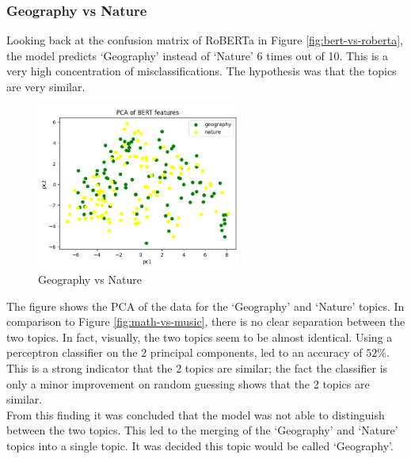 \subsubsection{Geography vs Nature}
Looking back at the confusion matrix of RoBERTa in Figure \ref{fig:bert-vs-roberta}, the model predicts `Geography' instead of
`Nature' 6 times out of 10. This is a very high concentration of misclassifications. The hypothesis was that the topics are very similar.
\begin{figure}
    \centering
    \includegraphics[width=0.6\textwidth]{../images/geography-vs-nature.png}
    \caption{Geography vs Nature}
    \label{fig:geography-vs-nature}
\end{figure}

The figure shows the PCA of the data for the `Geography' and `Nature' topics. In comparison to Figure \ref{fig:math-vs-music}, there is
no clear separation between the two topics. In fact, visually, the two topics seem to be almost identical. Using a perceptron classifier
on the 2 principal components, led to an accuracy of $52\%$. This is a strong indicator that the 2 topics are similar; the fact the classifier
is only a minor improvement on random guessing shows that the 2 topics are similar.\\
From this finding it was concluded that the model was not able to distinguish between the two topics. This led to the merging of the
`Geography' and `Nature' topics into a single topic. It was decided this topic would be called `Geography'.
